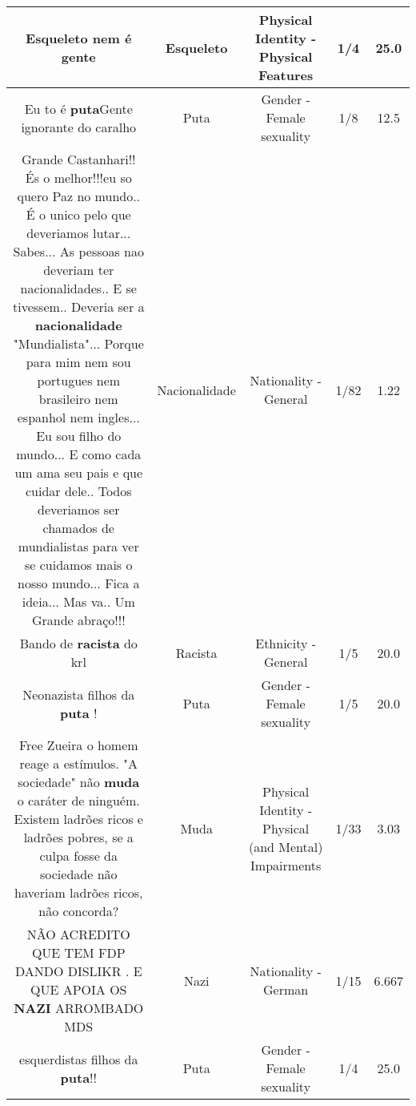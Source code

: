 \documentclass[11pt]{article}
\newlength\mylength
\begin{document}
\begin{center}
\begin{longtable}{|C{.65\mylength}|C{.30\mylength}|C{.12\mylength}|C{.12\mylength}|C{.12\mylength}|}
  \small Esqueleto nem é gente\normalsize   & Esqueleto & Physical Identity - Physical Features & 1/4 & 25.0 \\  \hline
  \small Eu to é \textbf{puta}Gente ignorante do caralho\normalsize   & Puta & Gender - Female sexuality & 1/8 & 12.5 \\  \hline
  \small Grande Castanhari!! És o melhor!!!eu so quero Paz no mundo.. É o unico pelo que deveriamos lutar...  Sabes... As pessoas nao deveriam ter nacionalidades.. E se tivessem.. Deveria ser a \textbf{nacionalidade} "Mundialista"... Porque para mim nem sou portugues nem brasileiro nem espanhol nem ingles... Eu sou filho do mundo... E como cada um ama seu pais e que cuidar dele.. Todos deveriamos ser chamados de mundialistas para ver se cuidamos mais o nosso mundo... Fica a ideia... Mas va.. Um Grande abraço!!!\normalsize   & Nacionalidade & Nationality - General & 1/82 & 1.22 \\  \hline
  \small Bando de \textbf{racista} do krl\normalsize   & Racista & Ethnicity - General & 1/5 & 20.0 \\  \hline
  \small Neonazista filhos da \textbf{puta} !\normalsize   & Puta & Gender - Female sexuality & 1/5 & 20.0 \\  \hline
  \small Free Zueira o homem reage a estímulos. "A sociedade" não \textbf{muda} o caráter de ninguém. Existem ladrões ricos e ladrões pobres, se a culpa fosse da sociedade não haveriam ladrões ricos, não concorda?\normalsize   & Muda & Physical Identity - Physical (and Mental) Impairments & 1/33 & 3.03 \\  \hline
  \small NÃO ACREDITO QUE TEM FDP  DANDO DISLIKR . E QUE APOIA OS \textbf{NAZI}  ARROMBADO MDS\normalsize   & Nazi & Nationality - German & 1/15 & 6.667 \\  \hline
  \small esquerdistas filhos da \textbf{puta}!!\normalsize   & Puta & Gender - Female sexuality & 1/4 & 25.0 \\  \hline

\end{longtable}
\end{center}
\end{document}
